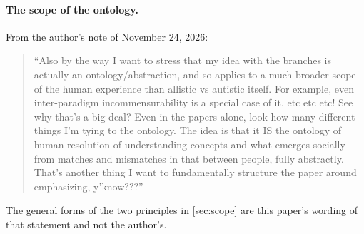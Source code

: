\paragraph{The scope of the ontology.} From the author's note of November 24, 2026:
\begin{quote}
``Also by the way I want to stress that my idea with the branches is actually an ontology/abstraction, and so applies to a much broader scope of the human experience than allistic vs autistic itself. For example, even inter-paradigm incommensurability is a special case of it, etc etc etc! See why that's a big deal? Even in the papers alone, look how many different things I'm tying to the ontology. The idea is that it IS the ontology of human resolution of understanding concepts and what emerges socially from matches and mismatches in that between people, fully abstractly. That's another thing I want to fundamentally structure the paper around emphasizing, y'know???''
\end{quote}
The general forms of the two principles in \autoref{sec:scope} are this paper's wording of that statement and not the author's.


